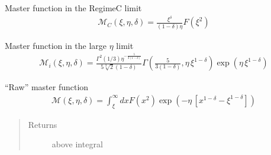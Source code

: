 \documentclass[letterpaper,10pt,english]{sphinxmanual}
\begin{document}
\begin{fulllineitems}
\label{\detokenize{diffsph.spectra:diffsph.spectra.analytics.M_C}}
\sphinxAtStartPar
Master function in the Regime\sphinxhyphen{}C limit
\begin{equation*}
\begin{split}\mathcal M_C(\xi,\eta,\delta) = \frac{\xi^\delta}{(1-\delta)\eta} F(\xi^2)\end{split}
\end{equation*}
\end{fulllineitems}


\begin{fulllineitems}
\label{\detokenize{diffsph.spectra:diffsph.spectra.analytics.M_i}}
\sphinxAtStartPar
Master function in the large \(\eta\) limit
\begin{equation*}
\begin{split}\mathcal M_i(\xi,\eta,\delta) = \frac{\Gamma^2(1/3)\eta^{-\frac{5}{3(1-\delta)}}}{5\sqrt[3]{2}(1-\delta)}\Gamma\left(\frac{5}{3(1-\delta)},\eta\, \xi^{1 - \delta}\right)\exp\left(\eta\,  \xi^{1-\delta}\right)\end{split}
\end{equation*}
\end{fulllineitems}


\begin{fulllineitems}
\label{\detokenize{diffsph.spectra:diffsph.spectra.analytics.M_raw}}
\sphinxAtStartPar
“Raw” master function
\begin{equation*}
\begin{split}\mathcal M(\xi,\eta,\delta) = \int_\xi^\infty dx F(x^2)\exp\left(-\eta\,[x^{1-\delta}-\xi^{1-\delta}]\right)\end{split}
\end{equation*}\begin{quote}\begin{description}
\item[{Returns}] \leavevmode
\sphinxAtStartPar
above integral

\end{description}\end{quote}

\end{fulllineitems}
\end{document}
